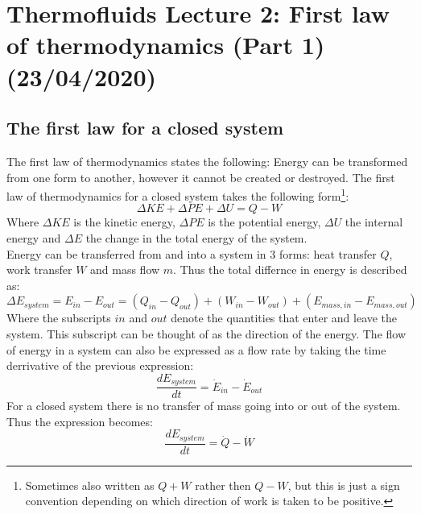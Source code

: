 \documentclass[11pt, a4paper]{article}
\begin{document}
\setcounter{section}{1}
\setcounter{equation}{0}

\section{Thermofluids Lecture 2: First law of thermodynamics (Part 1) (23/04/2020)}


\subsection{The first law for a closed system}
The first law of thermodynamics states the following: Energy can be transformed from one form to another, however it cannot be created or destroyed. The first law of thermodynamics for a closed system takes the following form\footnote{Sometimes also written as $Q + W$ rather then $Q - W$, but this is just a sign convention depending on which direction of work is taken to be positive.}:
\begin{equation}
  \Delta KE + \Delta PE + \Delta U = Q - W
\end{equation}
Where $\Delta KE$ is the kinetic energy, $\Delta PE$ is the potential energy, $\Delta U$ the internal energy and $\Delta E$ the change in the total energy of the system.\\
Energy can be transferred from and into a system in 3 forms: heat transfer $Q$, work transfer $W$ and mass flow $m$. Thus the total differnce in energy is described as:
\begin{equation}
  \Delta E_{system} = E_{in} - E_{out} = (Q_{in} - Q_{out}) + (W_{in} - W_{out}) + (E_{mass,in} - E_{mass,out})
\end{equation}
Where the subscripts $in$ and $out$ denote the quantities that enter and leave the system. This subscript can be thought of as the direction of the energy. The flow of energy in a system can also be expressed as a flow rate by taking the time derrivative of the previous expression:
\begin{equation}
  \frac{dE_{system}}{dt} = \dot{E}_{in} - \dot{E}_{out}
\end{equation}
For a closed system there is no transfer of mass going into or out of the system. Thus the expression becomes:
\begin{equation}
  \frac{dE_{system}}{dt} = \dot{Q} - \dot{W}
\end{equation}
\end{document}
